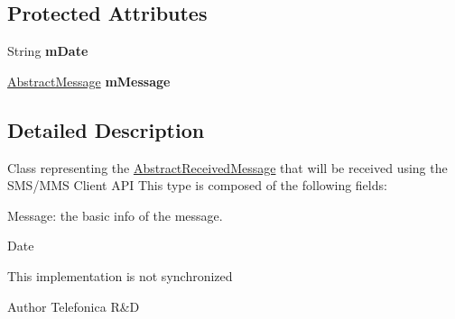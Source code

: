 \subsection*{Protected Attributes}
\begin{DoxyCompactItemize}
\item 
\hypertarget{classcom_1_1bluevia_1_1messagery_1_1mo_1_1data_1_1AbstractReceivedMessage_a6df7251ce6d54ac03fca4681bb8c70eb}{
String {\bfseries mDate}}
\label{classcom_1_1bluevia_1_1messagery_1_1mo_1_1data_1_1AbstractReceivedMessage_a6df7251ce6d54ac03fca4681bb8c70eb}

\item 
\hypertarget{classcom_1_1bluevia_1_1messagery_1_1mo_1_1data_1_1AbstractReceivedMessage_ae0fcdb4ed69d591ff1c0b265aabc0da1}{
\hyperlink{classcom_1_1bluevia_1_1messagery_1_1data_1_1AbstractMessage}{AbstractMessage} {\bfseries mMessage}}
\label{classcom_1_1bluevia_1_1messagery_1_1mo_1_1data_1_1AbstractReceivedMessage_ae0fcdb4ed69d591ff1c0b265aabc0da1}

\end{DoxyCompactItemize}


\subsection{Detailed Description}
Class representing the \hyperlink{classcom_1_1bluevia_1_1messagery_1_1mo_1_1data_1_1AbstractReceivedMessage}{AbstractReceivedMessage} that will be received using the SMS/MMS Client API This type is composed of the following fields: 
\begin{DoxyItemize}
\item Message: the basic info of the message. 
\item Date 
\end{DoxyItemize}

This implementation is not synchronized

\begin{DoxyAuthor}{Author}
Telefonica R\&D 
\end{DoxyAuthor}


